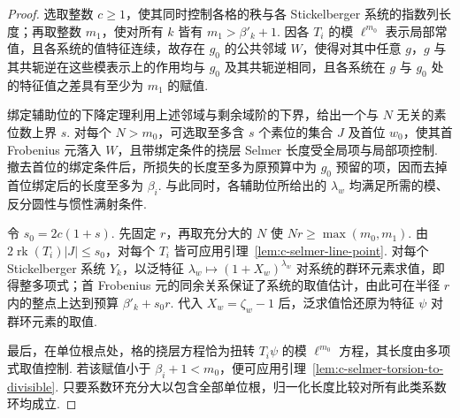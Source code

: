 \begin{proof}
选取整数 $c\ge1$，使其同时控制各格的秩与各 Stickelberger 系统的指数列长度；再取整数 $m_1$，使对所有 $k$ 皆有 $m_1>\beta'_k+1$.
因各 $T_i$ 的模 $\ell^{m_0}$ 表示局部常值，且各系统的值特征连续，故存在 $g_0$ 的公共邻域 $W$，使得对其中任意 $g$，$g$ 与其共轭逆在这些模表示上的作用均与 $g_0$ 及其共轭逆相同，且各系统在 $g$ 与 $g_0$ 处的特征值之差具有至少为 $m_1$ 的赋值.

绑定辅助位的下降定理利用上述邻域与剩余域阶的下界，给出一个与 $N$ 无关的素位数上界 $s$.
对每个 $N>m_0$，可选取至多含 $s$ 个素位的集合 $J$ 及首位 $w_0$，使其首 Frobenius 元落入 $W$，且带绑定条件的挠层 Selmer 长度受全局项与局部项控制.
撤去首位的绑定条件后，所损失的长度至多为原预算中为 $g_0$ 预留的项，因而去掉首位绑定后的长度至多为 $\beta_i$.
与此同时，各辅助位所给出的 $\lambda_w$ 均满足所需的模、反分圆性与惯性满射条件.

令 $s_0=2c(1+s)$. 先固定 $r$，再取充分大的 $N$ 使 $Nr\ge\max(m_0,m_1)$.
由 $2\operatorname{rk}(T_i)|J|\le s_0$，对每个 $T_i$ 皆可应用引理~\ref{lem:c-selmer-line-point}.
对每个 Stickelberger 系统 $Y_k$，以泛特征 $\lambda_w\mapsto (1+X_w)^{\lambda_w}$ 对系统的群环元素求值，即得整多项式；首 Frobenius 元的同余关系保证了系统的取值估计，由此可在半径 $r$ 内的整点上达到预算 $\beta'_k+s_0r$.
代入 $X_w=\zeta_w-1$ 后，泛求值恰还原为特征 $\psi$ 对群环元素的取值.

最后，在单位根点处，格的挠层方程恰为扭转 $T_i\psi$ 的模 $\ell^{m_0}$ 方程，其长度由多项式取值控制.
若该赋值小于 $\beta_i+1<m_0$，便可应用引理~\ref{lem:c-selmer-torsion-to-divisible}.
只要系数环充分大以包含全部单位根，归一化长度比较对所有此类系数环均成立.
\end{proof}

